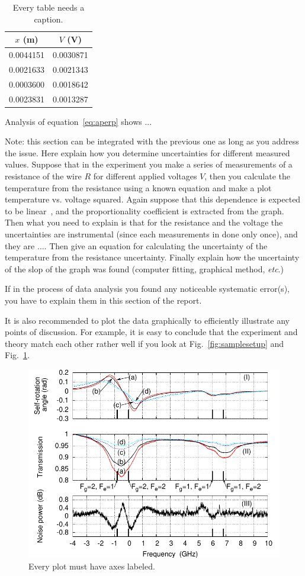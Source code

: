 \documentclass[letterpaper,12pt]{article}
\begin{document}
\begin{table}[ht]
\begin{center}
\caption{Every table needs a caption.}
\label{tbl:bins} %
\begin{tabular}{|cc|}
\hline
\multicolumn{1}{|c}{$x$ (m)} & \multicolumn{1}{c|}{$V$ (V)} \\
\hline
0.0044151 &   0.0030871 \\
0.0021633 &   0.0021343 \\
0.0003600 &   0.0018642 \\
0.0023831 &   0.0013287 \\
\hline
\end{tabular}
\end{center}
\end{table}

Analysis of equation~\ref{eq:aperp} shows ...

Note: this section can be integrated with the previous one as long as you
address the issue. Here explain how you determine uncertainties for different
measured values. Suppose that in the experiment you make a series of
measurements of a resistance of the wire $R$ for different applied voltages
$V$, then you calculate the temperature from the resistance using a known
equation and make a plot  temperature vs. voltage squared. Again suppose that
this dependence is expected to be linear~\cite{Cyr}, and the proportionality coefficient
is extracted from the graph. Then what you need to explain is that for the
resistance and the voltage the uncertainties are instrumental (since each
measurements in done only once), and they are $\dots$. Then give an equation
for calculating the uncertainty of the temperature from the resistance
uncertainty. Finally explain how the uncertainty of the slop of the graph was
found (computer fitting, graphical method, \emph{etc}.)

If in the process of data analysis you found any noticeable systematic
error(s), you have to explain them in this section of the report.

It is also recommended to plot the data graphically to efficiently illustrate
any points of discussion. For example, it is easy to conclude that the
experiment and theory match each other rather well if you look at
Fig.~\ref{fig:samplesetup} and Fig.~\ref{fig:exp_plots}.

\begin{figure}[ht]
  \centering
      \includegraphics[width=0.5\columnwidth]{sr_squeezing_vs_detuning}

        \caption{
                \label{fig:exp_plots}
                Every plot must have axes labeled.
        }
\end{figure}
\end{document}
